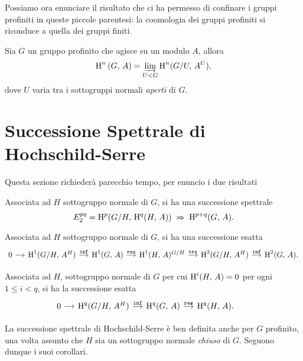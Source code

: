 \begin{profinite}
Possiamo ora enunciare il risultato che ci ha permesso di confinare i gruppi profiniti in queste piccole parentesi: la coomologia dei gruppi profiniti si riconduce a quella dei gruppi finiti.

\begin{proposition}\label{limite}
	Sia $ G $ un gruppo profinito che agisce su un modulo $ A $, allora
	\[ \operatorname{H}^n \left(G, \, A \right)  = \varinjlim_{U < G} \operatorname{H}^n(G/U, \, A^U), \]
	dove $ U $ varia tra i sottogruppi normali \emph{aperti} di $ G $.
\end{proposition}
\end{profinite}


\section{Successione Spettrale di Hochschild-Serre}

Questa sezione richiederà parecchio tempo, per enuncio i due risultati

\begin{theorem}
	Associata ad $ H $ sottogruppo normale di $ G $, si ha una successione spettrale
	\[ E^{pq}_2 = \operatorname{H}^p(G/H, \, \operatorname{H}^q(H, \, A)) \;\Rightarrow\; \operatorname{H}^{p+q}(G, \, A). \]
\end{theorem}

\begin{corollary}\label{boo1}
	Associata ad $ H $ sottogruppo normale di $ G $, si ha una successione esatta
	\[\begin{tikzcd}[column sep = small]
	0 \rar & \HH^1(G/H, \, A^H) \rar["\Inf"]
	& \HH^1(G, \, A) \rar["\Res"]
	& \HH^1(H, \, A)^{G/H} \rar["\texttt{trs}"]
	& \HH^2(G/H, \, A^H) \rar["\Inf"]
	& \HH^2(G, \, A).
	\end{tikzcd} \]
\end{corollary}

\begin{corollary}\label{boo2}
	Associata ad $ H $, sottogruppo normale di $ G $ per cui $ \operatorname{H}^i(H, \, A ) = 0 $ per ogni $ 1 \leq i < q $, si ha la successione esatta
	\[\begin{tikzcd}[column sep = small]
	0 \rar & \HH^q(G/H, \, A^H) \rar["\Inf"]
	& \HH^q(G, \, A) \rar["\Res"]
	& \HH^q(H, \, A).
	\end{tikzcd} \qquad  \]
\end{corollary}

\begin{profinite}
	La successione spettrale di Hochschild-Serre è ben definita anche per $ G $ profinito, una volta assunto che $ H $ sia un sottogruppo normale \emph{chiuso} di $ G $. Seguono dunque i suoi corollari. \todo[ah si? perche?]
\end{profinite}


